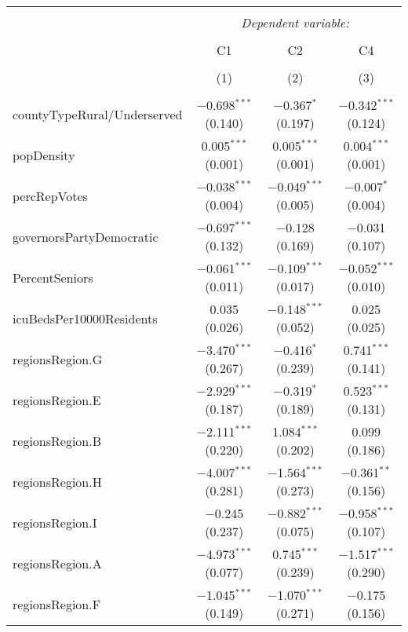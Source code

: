 
\begin{table}[!htbp] \centering 
  \caption{} 
  \label{} 
\begin{tabular}{@{\extracolsep{5pt}}lccc} 
\\[-1.8ex]\hline 
\hline \\[-1.8ex] 
 & \multicolumn{3}{c}{\textit{Dependent variable:}} \\ 
\cline{2-4} 
\\[-1.8ex] & C1 & C2 & C4 \\ 
\\[-1.8ex] & (1) & (2) & (3)\\ 
\hline \\[-1.8ex] 
 countyTypeRural/Underserved & $-$0.698$^{***}$ (0.140) & $-$0.367$^{*}$ (0.197) & $-$0.342$^{***}$ (0.124) \\ 
  popDensity & 0.005$^{***}$ (0.001) & 0.005$^{***}$ (0.001) & 0.004$^{***}$ (0.001) \\ 
  percRepVotes & $-$0.038$^{***}$ (0.004) & $-$0.049$^{***}$ (0.005) & $-$0.007$^{*}$ (0.004) \\ 
  governorsPartyDemocratic & $-$0.697$^{***}$ (0.132) & $-$0.128 (0.169) & $-$0.031 (0.107) \\ 
  PercentSeniors & $-$0.061$^{***}$ (0.011) & $-$0.109$^{***}$ (0.017) & $-$0.052$^{***}$ (0.010) \\ 
  icuBedsPer10000Residents & 0.035 (0.026) & $-$0.148$^{***}$ (0.052) & 0.025 (0.025) \\ 
  regionsRegion.G & $-$3.470$^{***}$ (0.267) & $-$0.416$^{*}$ (0.239) & 0.741$^{***}$ (0.141) \\ 
  regionsRegion.E & $-$2.929$^{***}$ (0.187) & $-$0.319$^{*}$ (0.189) & 0.523$^{***}$ (0.131) \\ 
  regionsRegion.B & $-$2.111$^{***}$ (0.220) & 1.084$^{***}$ (0.202) & 0.099 (0.186) \\ 
  regionsRegion.H & $-$4.007$^{***}$ (0.281) & $-$1.564$^{***}$ (0.273) & $-$0.361$^{**}$ (0.156) \\ 
  regionsRegion.I & $-$0.245 (0.237) & $-$0.882$^{***}$ (0.075) & $-$0.958$^{***}$ (0.107) \\ 
  regionsRegion.A & $-$4.973$^{***}$ (0.077) & 0.745$^{***}$ (0.239) & $-$1.517$^{***}$ (0.290) \\ 
  regionsRegion.F & $-$1.045$^{***}$ (0.149) & $-$1.070$^{***}$ (0.271) & $-$0.175 (0.156) \\ 

\end{tabular}
\end{table}
